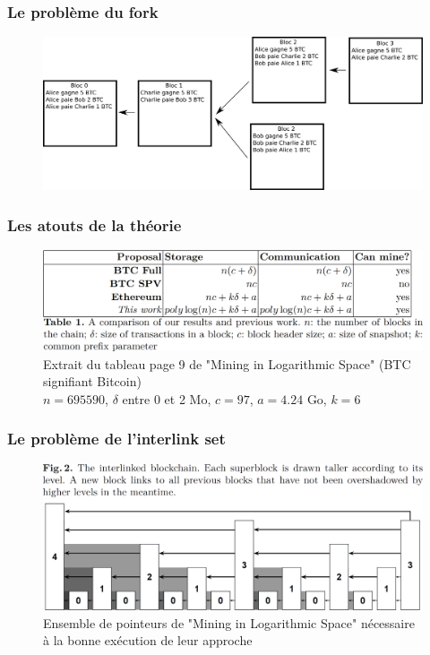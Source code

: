 \documentclass{beamer}
\begin{document}
\begin{frame}

\frametitle{Le problème du fork}

\begin{figure}[H]
		\includegraphics[width=\linewidth]{illustrationsSoutenance/forkContinue.png}
	\end{figure}

\end{frame}


\begin{frame}

\frametitle{Les atouts de la théorie}

\begin{figure}[H]
		\includegraphics[width=\linewidth]{illustrations/tableauPage9.png}
		\caption{Extrait du tableau page 9 de "Mining in Logarithmic Space" (BTC signifiant Bitcoin)\\$n = 695 590$, $\delta$ entre 0 et 2 Mo, $c = 97$, $a = 4.24$ Go, $k = 6$}
	\end{figure}

\end{frame}

\begin{frame}

\frametitle{Le problème de l'interlink set}

\begin{figure}[H]
		\includegraphics[width=\linewidth]{illustrations/interlinkSet.png}
		\caption{Ensemble de pointeurs de "Mining in Logarithmic Space" nécessaire à la bonne exécution de leur approche}
	\end{figure}

\end{frame}
\end{document}
